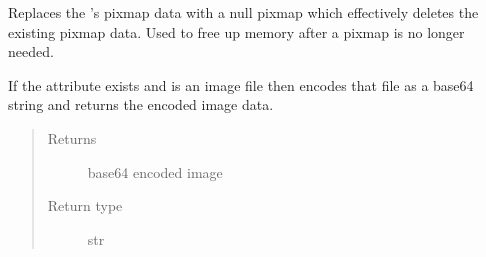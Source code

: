 \documentclass[letterpaper,10pt,english]{sphinxmanual}
\begin{document}
\begin{fulllineitems}
\begin{fulllineitems}
\label{\detokenize{polo.crystallography:polo.crystallography.image.Image.delete_pixmap_data}}
Replaces the {\hyperref[\detokenize{polo.crystallography:polo.crystallography.image.Image}]{}}’s
pixmap data with a null pixmap which
effectively deletes the existing pixmap data. Used to free up
memory after a pixmap is no longer needed.

\end{fulllineitems}


\begin{fulllineitems}
\label{\detokenize{polo.crystallography:polo.crystallography.image.Image.encode_base64}}
\end{fulllineitems}


\begin{fulllineitems}
\label{\detokenize{polo.crystallography:polo.crystallography.image.Image.encode_bytes}}
If the {\hyperref[\detokenize{polo.crystallography:polo.crystallography.image.Image.path}]{}}
attribute exists and is an image file then encodes
that file as a base64 string and returns the encoded
image data.
\begin{quote}\begin{description}
\item[{Returns}] \leavevmode
base64 encoded image

\item[{Return type}] \leavevmode
str

\end{description}\end{quote}

\end{fulllineitems}



\end{fulllineitems}
\end{document}
